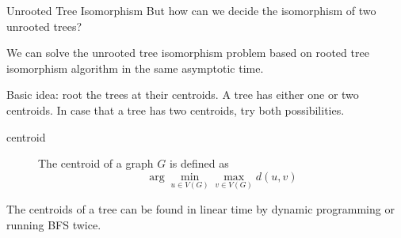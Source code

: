 \documentclass[handout]{beamer}
\begin{document}
\begin{frame}{Unrooted Tree Isomorphism}
  But how can we decide the isomorphism of two unrooted trees?
  
  \pause
  \begin{theorem}
  	We can solve the unrooted tree isomorphism problem based on rooted tree isomorphism algorithm in the same asymptotic time.
  \end{theorem}
  
  Basic idea: root the trees at their centroids. A tree has either one or two centroids. In case that a tree has two centroids, try both possibilities.
  
  \pause
  \begin{description}
  	\item[centroid] The centroid of a graph $G$ is defined as 
  	$$ \arg\min_{u \in V(G)} \max_{v \in V(G)} d(u, v) $$
  \end{description}
  
  \pause
  The centroids of a tree can be found in linear time by dynamic programming or running BFS twice.
\end{frame}
\end{document}
